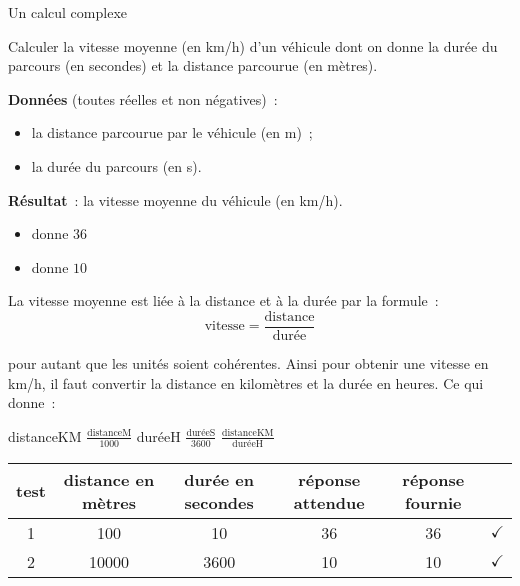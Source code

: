 \begin{Fiche}{Un calcul complexe}
\label{fiche:calcul-complexe}

	Calculer la vitesse moyenne (en km/h) d’un véhicule dont on donne
	la durée du parcours (en secondes) 
	et la distance parcourue (en mètres).

	
	\textbf{Données} (toutes réelles et non négatives)~:
		\begin{itemize}
		\item la distance parcourue par le véhicule (en m)~;
		\item la durée du parcours (en s).
		\end{itemize}
		
	\textbf{Résultat}~: la vitesse moyenne du véhicule (en km/h).

	\begin{center}
	\end{center}


	\begin{itemize}
	\item {} donne $36$
	\item {} donne $10$
	\end{itemize}


	La vitesse moyenne est liée à la distance et à la durée par la formule~:
	\[
		\textrm{vitesse} = \frac{\textrm{distance}}{\textrm{durée}}
	\]

	pour autant que les unités soient cohérentes.
	Ainsi pour obtenir une vitesse en km/h, 
	il faut convertir la distance en kilomètres 
	et la durée en heures.
	Ce qui donne~:
		
	\begin{LDA}
			\Let distanceKM \Gets $\frac{\textrm{distanceM}}{1000}$
			\Let duréeH \Gets $\frac{\textrm{duréeS}}{3600}$
			\Return $\frac{\textrm{distanceKM}}{\textrm{duréeH}}$
		\EndAlgo
	\end{LDA}


	\begin{center}
		\begin{tabular}{|c|cccc|c|}
		\hline
		test \no & distance en mètres & durée en secondes & réponse attendue & réponse fournie & {} \\\hline
		\hline 
		1 & 100   & 10   & 36 & 36 & {\color{ForestGreen}$\checkmark$} \\\hline
		2 & 10000 & 3600 & 10 & 10 & {\color{ForestGreen}$\checkmark$} \\\hline
		\end{tabular}
	\end{center}								


\end{Fiche}
